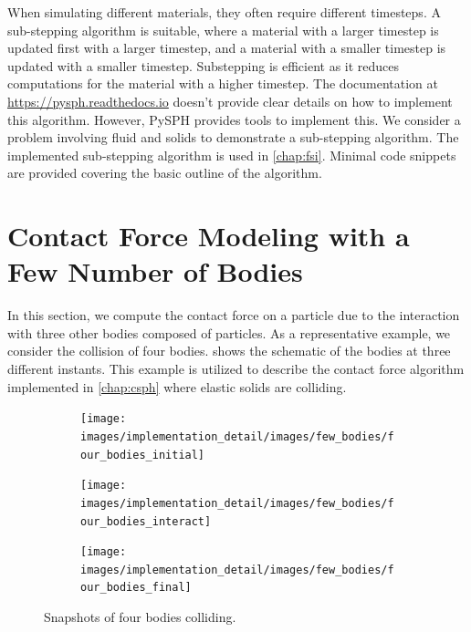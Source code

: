 When simulating different materials, they often require different timesteps. A
sub-stepping algorithm is suitable, where a material with a larger timestep is
updated first with a larger timestep, and a material with a smaller timestep is
updated with a smaller timestep. Substepping is efficient as it reduces
computations for the material with a higher timestep. The documentation at
\url{https://pysph.readthedocs.io} doesn't provide clear details on how to
implement this algorithm. However, PySPH provides tools to implement this. We
consider a problem involving fluid and solids to demonstrate a sub-stepping
algorithm. The implemented sub-stepping algorithm is used in \cref{chap:fsi}.
Minimal code snippets are provided covering the basic outline of the algorithm.


\section{Contact Force Modeling with a Few Number of Bodies}
\label{sec:tracking-few-bodies}
In this section, we compute the contact force on a particle due to the
interaction with three other bodies composed of particles. As a representative
example, we consider the collision of four bodies. 
shows the schematic of the bodies at three different instants. This example is
utilized to describe the contact force algorithm implemented in \cref{chap:csph}
where elastic solids are colliding.
\begin{figure}[!htpb]
  \centering
  \begin{subfigure}{0.32\textwidth}
    \centering
    \texttt{[image: images/implementation\_detail/images/few\_bodies/four\_bodies\_initial]}
  \end{subfigure}
  \begin{subfigure}{0.32\textwidth}
    \centering
    \texttt{[image: images/implementation\_detail/images/few\_bodies/four\_bodies\_interact]}
  \end{subfigure}
  \begin{subfigure}{0.32\textwidth}
    \centering
    \texttt{[image: images/implementation\_detail/images/few\_bodies/four\_bodies\_final]}
  \end{subfigure}
  \caption{Snapshots of four bodies colliding.}
\label{fig:id:four_bodies_contact}
\end{figure}



